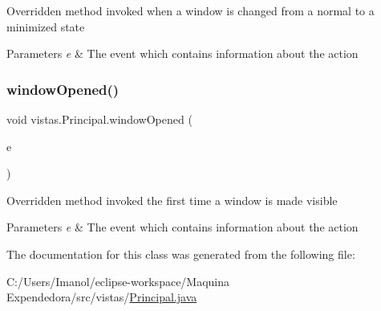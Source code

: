 Overridden method invoked when a window is changed from a normal to a minimized state 
\begin{DoxyParams}{Parameters}
{\em e} & The event which contains information about the action \\
\hline
\end{DoxyParams}
\mbox{\label{classvistas_1_1_principal_adad5c3a92bd295ce50b2f66aceaa8524}} 
\subsubsection{\texorpdfstring{window\+Opened()}{windowOpened()}}
{\footnotesize\ttfamily void vistas.\+Principal.\+window\+Opened (\begin{DoxyParamCaption}\item[{Window\+Event}]{e }\end{DoxyParamCaption})}

Overridden method invoked the first time a window is made visible 
\begin{DoxyParams}{Parameters}
{\em e} & The event which contains information about the action \\
\hline
\end{DoxyParams}


The documentation for this class was generated from the following file\+:\begin{DoxyCompactItemize}
\item 
C\+:/\+Users/\+Imanol/eclipse-\/workspace/\+Maquina Expendedora/src/vistas/\mbox{\hyperlink{_principal_8java}{Principal.\+java}}\end{DoxyCompactItemize}

